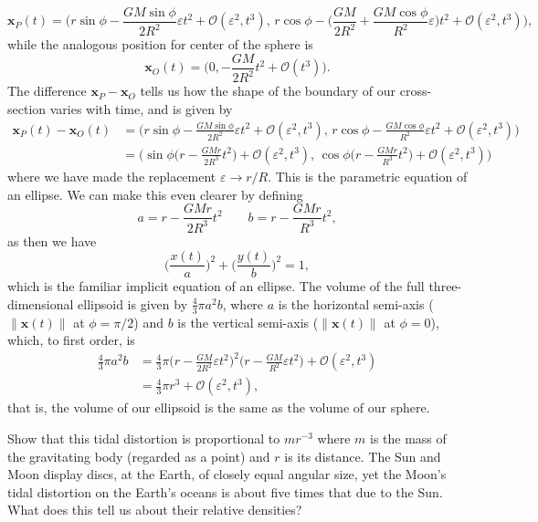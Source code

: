 \documentclass[../the-road-to-reality.tex]{subfiles}
\begin{document}
\begin{questions}
\begin{solution}
		\[
			\mathbf{x}_P(t) = \Big(r\sin\phi - \frac{GM\sin\phi}{2R^2}\varepsilon{t}^2 + \mathcal{O}(\varepsilon^2,t^3),\, r\cos\phi - \big(\frac{GM}{2R^2} + \frac{GM\cos\phi}{R^2}\varepsilon\big)t^2 + \mathcal{O}(\varepsilon^2,t^3)\Big)
		,\] 
		while the analogous position for center of the sphere is
		\[
			\mathbf{x}_O(t) = \Big(0, -\frac{GM}{2R^2}t^2 + \mathcal{O}(t^3)\Big)
		.\] 
		The difference $\mathbf{x}_P - \mathbf{x}_O$ tells us how the shape of the boundary of our cross-section varies with time, and is given by
		\begin{align*}
			\mathbf{x}_P(t) - \mathbf{x}_O(t) &= \Big(r\sin\phi - \frac{GM\sin\phi}{2R^2}\varepsilon{t}^2 + \mathcal{O}(\varepsilon^2,t^3),\, r\cos\phi - \frac{GM\cos\phi}{R^2}\varepsilon{t^2} + \mathcal{O}(\varepsilon^2,t^3)\Big) \\
							  &= \Big(\sin\phi\big(r - \frac{GMr}{2R^3}{t}^2\big) + \mathcal{O}(\varepsilon^2,t^3),\, \cos\phi\big(r - \frac{GMr}{R^3}{t^2}\big) + \mathcal{O}(\varepsilon^2,t^3)\Big)
		\end{align*}
		where we have made the replacement $\varepsilon \to r/R$. This is the parametric equation of an ellipse. We can make this even clearer by defining
		\[
			a = r - \frac{GMr}{2R^3}t^2 \qquad b = r - \frac{GMr}{R^3}t^2
		,\] 
		as then we have
		\[
			\Big(\frac{x(t)}{a}\Big)^2 + \Big(\frac{y(t)}{b}\Big)^2 = 1	
		,\] 
		which is the familiar implicit equation of an ellipse.
		The volume of the full three-dimensional ellipsoid is given by $\frac{4}{3}\pi{a^2b}$, where $a$ is the horizontal semi-axis ($\|\mathbf{x}(t)\|$ at $\phi = \pi/2$) and $b$ is the vertical semi-axis ($\|\mathbf{x}(t)\|$ at $\phi = 0$), which, to first order, is
		\begin{align*}
			\frac{4}{3}\pi{a^2b} &= \frac{4}{3}\pi\Big(r - \frac{GM}{2R^2}\varepsilon{t^2}\Big)^2\Big(r - \frac{GM}{R^2}\varepsilon{t^2}\Big) + \mathcal{O}(\varepsilon^2, t^3) \\	
					     &= \frac{4}{3}\pi{r^3} + \mathcal{O}(\varepsilon^2, t^3),
		\end{align*}
		that is, the volume of our ellipsoid is the same as the volume of our sphere.	
	\end{solution}

	\question Show that this tidal distortion is proportional to $mr^{-3}$ where $m$ is the mass of the gravitating body (regarded as a point) and $r$ is its distance. The Sun and Moon display discs, at the Earth, of closely equal angular size, yet the Moon's tidal distortion on the Earth's oceans is about five times that due to the Sun. What does this tell us about their relative densities?


\end{questions}
\end{document}
